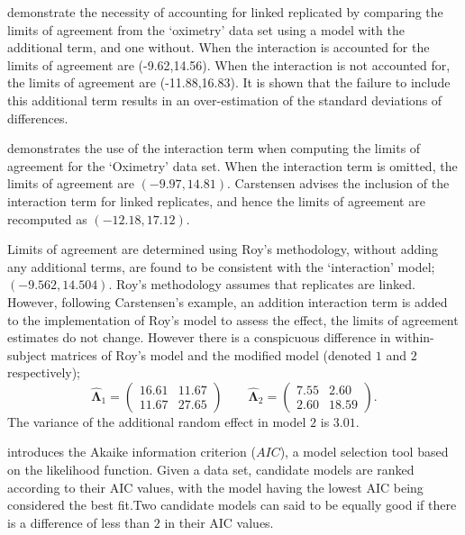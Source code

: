 \documentclass[12pt, a4paper]{report}
\theoremstyle{plain}
\theoremstyle{definition}
\theoremstyle{remark}
\begin{document}
\citet{BXC2008} demonstrate the necessity of accounting for linked replicated by comparing the limits of agreement from the `oximetry' data set using a model with the additional term, and one without. When the interaction is accounted for the limits of agreement are (-9.62,14.56). When the interaction is not accounted for, the limits of agreement are (-11.88,16.83). It is shown that the failure to include this additional term results in an over-estimation of the standard deviations of differences.

\citet{BXC2008} demonstrates the use of the interaction term when computing the limits of agreement for the `Oximetry' data set. When the interaction term is omitted, the limits of agreement are $(-9.97, 14.81)$. Carstensen advises the inclusion of the interaction term for linked replicates, and hence the limits of agreement are recomputed as $(-12.18,17.12)$.

Limits of agreement are determined using Roy's methodology, without adding any additional terms, are found to be consistent with the `interaction' model; $(-9.562, 14.504 )$. Roy's methodology assumes that replicates are linked. However, following Carstensen's example, an addition interaction term is added to the implementation of Roy's model to assess the effect, the limits of agreement estimates do not change. However there is a conspicuous difference in within-subject matrices of Roy's model and the modified model (denoted $1$ and $2$ respectively);
\begin{equation}
\hat{\boldsymbol{\Lambda}}_{1}= \left(\begin{array}{cc}
16.61 &	11.67\\
11.67 & 27.65 \end{array}\right) \qquad
\boldsymbol{\hat{\Lambda}}_{2}= \left( \begin{array}{cc}
7.55 & 2.60 \\
2.60 & 18.59 \end{array} \right). 
\end{equation}
The variance of the additional random effect in model $2$ is $3.01$.


\citet{akaike} introduces the Akaike information criterion ($AIC$), a model 
selection tool based on the likelihood function. Given a data set, candidate models
are ranked according to their AIC values, with the model having the lowest AIC being considered the best fit.Two candidate models can said to be equally good if there is a difference of less than $2$ in their AIC values.
\end{document}

